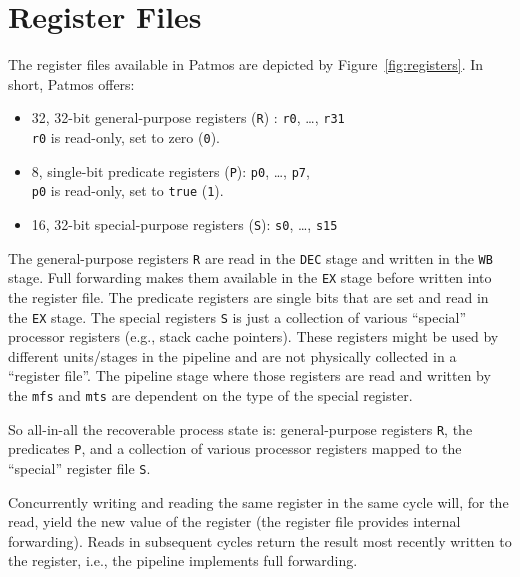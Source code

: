 \documentclass[a4paper,fontsize=10pt,twoside,DIV15,BCOR12mm,headinclude=true,footinclude=false,pagesize,bibtotoc]{scrbook}
\newcommand{\code}[1]{{\texttt{#1}}}
\newcommand{\comment}[3]{

\textsf{\textbf{#1}} {\color{#3}#2}}
\newcommand{\martin}[1]{\comment{Martin}{#1}{Blue}}
\newcommand{\stefan}[1]{\comment{Stefan}{#1}{RoyalPurple}}
\renewcommand{\martin}[1]{}
\renewcommand{\stefan}[1]{}
\begin{document}



\section{Register Files}

The register files available in Patmos are depicted by
Figure~\ref{fig:registers}. In short, Patmos offers:
\begin{itemize}
  \item 32, 32-bit general-purpose registers (\texttt{R}) : \texttt{r0}, \dots, \texttt{r31} \\
    \texttt{r0} is read-only, set to zero (\texttt{0}).
  \item 8, single-bit predicate registers (\texttt{P}): \texttt{p0}, \dots, \texttt{p7}, \\
    \texttt{p0} is read-only, set to \texttt{true} (\texttt{1}).
  \item 16, 32-bit special-purpose registers (\texttt{S}): \texttt{s0}, \dots, \texttt{s15}
\end{itemize}

The general-purpose registers \texttt{R} are read in the \code{DEC} stage
and written in the \code{WB} stage. Full forwarding makes them available
in the \code{EX} stage before written into the register file.
The predicate registers are single bits that are set and read in the \code{EX}
stage.
The special registers \code{S} is just a collection of various ``special''
processor registers (e.g., stack cache pointers).
These registers might be used by different units/stages
in the pipeline and are not physically collected in a ``register file''.
The pipeline stage where those registers are read and written by the
\code{mfs} and \code{mts} are dependent on the type of the special
register.
%
\martin{The three `register' files shall constitute the state of the processor.
Every non-obvious register, such as method base, shall be mapped to a
`special' register. Even the current PC on an interrupt shall end up in a
register that is mapped into the special register domain.}
%
\stefan{Umm .. it would be really good to define somewhere in which stages which special register is actually read or written by mfs/mts
;).}
%
So all-in-all the recoverable process state is: general-purpose registers
\code{R}, the predicates \code{P}, and a collection of various processor
registers mapped to the ``special'' register file \code{S}.

Concurrently writing and reading the same register in the same cycle
will, for the read, yield the new value of the register (the register file
provides internal forwarding). Reads in
subsequent cycles return the result most recently written to the
register, i.e., the pipeline implements full forwarding.
\end{document}
